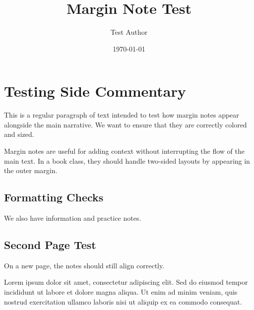 \documentclass{otbook}
\title{Margin Note Test}
\author{Test Author}
\date{\today}
\begin{document}
\makeotbooktitle

\chapter{Testing Side Commentary}

This is a regular paragraph of text intended to test how margin notes appear alongside the main narrative. We want to ensure that they are correctly colored and sized.


\vspace{2cm}

Margin notes are useful for adding context without interrupting the flow of the main text. In a book class, they should handle two-sided layouts by appearing in the outer margin.


\section{Formatting Checks}

We also have information and practice notes.



\newpage

\section{Second Page Test}

On a new page, the notes should still align correctly.


Lorem ipsum dolor sit amet, consectetur adipiscing elit. Sed do eiusmod tempor incididunt ut labore et dolore magna aliqua. Ut enim ad minim veniam, quis nostrud exercitation ullamco laboris nisi ut aliquip ex ea commodo consequat.
\end{document}
